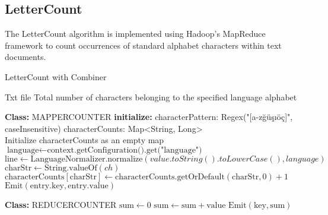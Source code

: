     

\subsection{LetterCount}
The LetterCount algorithm is implemented using Hadoop's MapReduce framework to count occurrences of standard alphabet characters within text documents.

\begin{algorithm}
    \caption{LetterCount with Combiner}
    \begin{algorithmic}[1]
    \Require Txt file
    \Ensure Total number of characters belonging to the specified language alphabet
    \\
    \Statex
    
    \textbf{Class:} MAPPERCOUNTER
    \State \textbf{initialize:}
    \State  characterPattern: Regex("[a-zğüşıöç]", caseInsensitive)
    \State  characterCounts: Map<String, Long> \\
    
        \State Initialize characterCounts as an empty map
    \EndProcedure\\
    
        \State $\text{language} \gets \text{context.getConfiguration().get("language")}$ 
        \State $\text{line} \gets \text{LanguageNormalizer.normalize}(value.toString().toLowerCase(), language)$
                \State $\text{charStr} \gets \text{String.valueOf}(ch)$
                \State $\text{characterCounts}[\text{charStr}] \gets \text{characterCounts.getOrDefault}(\text{charStr}, 0) + 1$
            \EndIf
        \EndFor
    \EndProcedure\\
    
            \State $\text{Emit}(\text{entry.key}, \text{entry.value})$
        \EndFor
    \EndProcedure\\
    
    \Statex
    
    \textbf{Class:} REDUCERCOUNTER
        \State $\text{sum} \gets 0$
            \State $\text{sum} \gets \text{sum} + \text{value}$
        \EndFor
        \State $\text{Emit}(\text{key}, \text{sum})$
    \EndProcedure
    \end{algorithmic}
    \end{algorithm}

